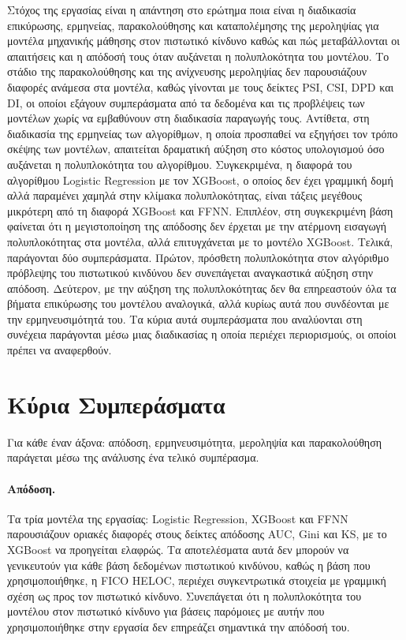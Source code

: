 Στόχος της εργασίας είναι η απάντηση στο ερώτημα ποια είναι η διαδικασία
επικύρωσης, ερμηνείας, παρακολούθησης και καταπολέμησης της μεροληψίας για
μοντέλα μηχανικής μάθησης στον πιστωτικό κίνδυνο καθώς και πώς μεταβάλλονται
οι απαιτήσεις και η απόδοσή τους όταν αυξάνεται η πολυπλοκότητα του μοντέλου.
Το στάδιο της παρακολούθησης και της ανίχνευσης μεροληψίας δεν παρουσιάζουν
διαφορές ανάμεσα στα μοντέλα, καθώς γίνονται με τους δείκτες PSI, CSI, DPD
και DI, οι οποίοι εξάγουν συμπεράσματα από τα δεδομένα και τις προβλέψεις
των μοντέλων χωρίς να εμβαθύνουν στη διαδικασία παραγωγής τους. Αντίθετα,
στη διαδικασία της ερμηνείας των αλγορίθμων, η οποία προσπαθεί να εξηγήσει
τον τρόπο σκέψης των μοντέλων, απαιτείται δραματική αύξηση στο κόστος
υπολογισμού όσο αυξάνεται η πολυπλοκότητα του αλγορίθμου. Συγκεκριμένα,
η διαφορά του αλγορίθμου Logistic Regression με τον XGBoost, ο οποίος δεν
έχει γραμμική δομή αλλά παραμένει χαμηλά στην κλίμακα πολυπλοκότητας,
είναι τάξεις μεγέθους μικρότερη από τη διαφορά XGBoost και FFNN. Επιπλέον,
στη συγκεκριμένη βάση φαίνεται ότι η μεγιστοποίηση της απόδοσης δεν έρχεται
με την ατέρμονη εισαγωγή πολυπλοκότητας στα μοντέλα, αλλά επιτυγχάνεται με
το μοντέλο XGBoost. Τελικά, παράγονται δύο συμπεράσματα. Πρώτον, πρόσθετη
πολυπλοκότητα στον αλγόριθμο πρόβλεψης του πιστωτικού κινδύνου δεν
συνεπάγεται αναγκαστικά αύξηση στην απόδοση. Δεύτερον, με την αύξηση της
πολυπλοκότητας δεν θα επηρεαστούν όλα τα βήματα επικύρωσης του μοντέλου
αναλογικά, αλλά κυρίως αυτά που συνδέονται με την ερμηνευσιμότητά του.
Τα κύρια αυτά συμπεράσματα που αναλύονται στη συνέχεια παράγονται μέσω μιας
διαδικασίας η οποία περιέχει περιορισμούς, οι οποίοι πρέπει να αναφερθούν.

\section{Κύρια Συμπεράσματα}
\label{sec:main_conclusions}

Για κάθε έναν άξονα: απόδοση, ερμηνευσιμότητα, μεροληψία και παρακολούθηση
παράγεται μέσω της ανάλυσης ένα τελικό συμπέρασμα.

\paragraph{Απόδοση.}
Τα τρία μοντέλα της εργασίας: Logistic Regression, XGBoost και FFNN παρουσιάζουν
οριακές διαφορές στους δείκτες απόδοσης AUC, Gini και KS, με το XGBoost να
προηγείται ελαφρώς. Τα αποτελέσματα αυτά δεν μπορούν να γενικευτούν για κάθε
βάση δεδομένων πιστωτικού κινδύνου, καθώς η βάση που χρησιμοποιήθηκε, η FICO
HELOC, περιέχει συγκεντρωτικά στοιχεία με γραμμική σχέση ως προς τον πιστωτικό
κίνδυνο. Συνεπάγεται ότι η πολυπλοκότητα του μοντέλου στον πιστωτικό κίνδυνο
για βάσεις παρόμοιες με αυτήν που χρησιμοποιήθηκε στην εργασία δεν επηρεάζει
σημαντικά την απόδοσή του.

